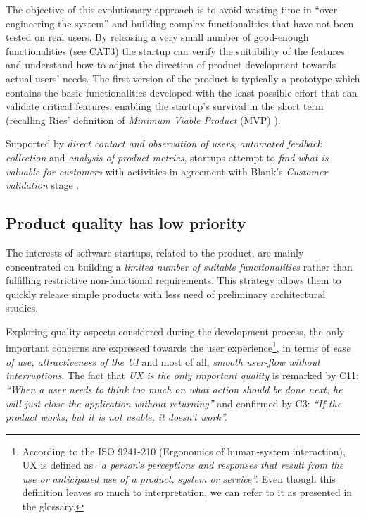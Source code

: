 \documentclass[10pt,journal,letterpaper,compsoc]{IEEEtran}
\begin{document}
The objective of this evolutionary approach is to avoid wasting time in ``over-engineering the system'' and building complex functionalities that have not been tested on real users. By releasing a very small number of good-enough functionalities (see CAT3) the startup can verify the suitability of the features and understand how to adjust the direction of product development towards actual users' needs. The first version of the product is typically a prototype which contains the basic functionalities developed with the least possible effort that can validate critical features, enabling the startup's survival in the short term (recalling  Ries' definition of \textit{Minimum Viable Product} (MVP) \cite{Ries2011}).

Supported by \textit{direct contact and observation of users}, \textit{automated feedback collection} and \textit{analysis of product metrics}, startups attempt to \textit{find what is valuable for customers} with activities in agreement with Blank's \textit{Customer validation} stage \cite{Blank2005}.

\subsection{Product quality has low priority}
\label{res:gsm:cat3}
The interests of software startups, related to the product, are mainly concentrated on building a  \textit{limited number of suitable functionalities} rather than fulfilling restrictive non-functional requirements. This strategy allows them to quickly release simple products with less need of preliminary architectural studies.


Exploring quality aspects considered during the development process, the only important concerns are expressed towards the user experience\footnote{According to the ISO 9241-210 (Ergonomics of human-system interaction), UX is defined as \textit{``a person's perceptions and responses that result from the use or anticipated use of a product, system or service''.} Even though this definition leaves so much to interpretation, we can refer to it as presented in the glossary.}, in terms of \textit{ease of use, attractiveness of the UI} and most of all, \textit{smooth user-flow without interruptions}. The fact that \textit{UX is the only important quality} is remarked by C11: \textit{``When a user needs to think too much on what action should be done next, he will just close the application without returning''} and confirmed by C3: \textit{``If the product works, but it is not usable, it doesn't work''.}
\end{document}
